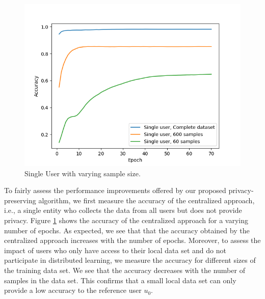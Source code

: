 \documentclass[conference]{IEEEtran}
\begin{document}
\begin{figure}[!h]
\centering
\includegraphics[width=\columnwidth, keepaspectratio]{SingleUserBaselines}
\caption{Single User with varying sample size.}
\label{fig:SingleUser}
\end{figure}
To fairly assess the performance improvements offered by our proposed privacy-preserving algorithm, we first measure the accuracy of
the centralized approach, i.e., a single entity who collects the data from all users but does not provide privacy. 
Figure \ref{fig:SingleUser} shows the accuracy of the centralized approach for a varying number of epochs. As expected, we see that
that the accuracy obtained by the centralized approach increases with the number of epochs. 
Moreover, to assess the impact of users who only have access to their local data set and do not participate in distributed
learning, we measure the accuracy for different sizes of the training data set. We see that the accuracy decreases with the number
of samples in the data set. This confirms that a small local data set can only provide a low accuracy to the reference user $u_0$.
\end{document}
